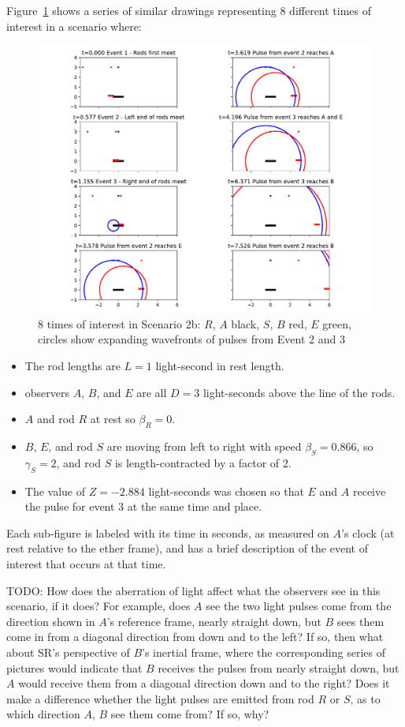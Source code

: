 \documentclass[a4paper]{article}
\theoremstyle{plain}
\theoremstyle{definition}
\begin{document}
Figure~\ref{fig:eight-times-of-interest-in-scenario-2b} shows a series
of similar drawings representing 8 different times of interest in a
scenario where:
\begin{figure}[h!]
	\centering
	\includegraphics[width=1.0\textwidth]{scen2b-L-1.0-D-3.0-beta_S-0.866-cropped.pdf}
	\caption{8 times of interest in Scenario 2b: $R$, $A$ black, $S$, $B$ red, $E$ green, circles show expanding wavefronts of pulses from Event 2 and 3}
	\label{fig:eight-times-of-interest-in-scenario-2b}
\end{figure}
\begin{itemize}
\item The rod lengths are $L=1$ light-second in rest length.
\item observers $A$, $B$, and $E$ are all $D=3$ light-seconds above
  the line of the rods.
\item $A$ and rod $R$ at rest so $\beta_R=0$.
\item $B$, $E$, and rod $S$ are moving from left to right with speed
  $\beta_S=0.866$, so $\gamma_S=2$, and rod $S$ is length-contracted
  by a factor of 2.
\item The value of $Z=-2.884$ light-seconds was chosen so that $E$ and
  $A$ receive the pulse for event 3 at the same time and place.
\end{itemize}
Each sub-figure is labeled with its time in seconds, as measured on
$A$'s clock (at rest relative to the ether frame), and has a brief
description of the event of interest that occurs at that time.

TODO: How does the aberration of light affect what the observers see
in this scenario, if it does?  For example, does $A$ see the two light
pulses come from the direction shown in $A$'s reference frame, nearly
straight down, but $B$ sees them come in from a diagonal direction
from down and to the left?  If so, then what about SR's perspective of
$B$'s inertial frame, where the corresponding series of pictures would
indicate that $B$ receives the pulses from nearly straight down, but
$A$ would receive them from a diagonal direction down and to the
right?  Does it make a difference whether the light pulses are emitted
from rod $R$ or $S$, as to which direction $A$, $B$ see them come
from?  If so, why?
\end{document}
